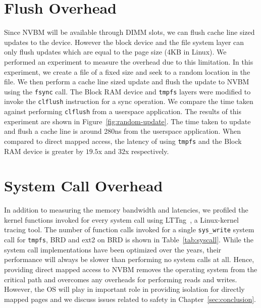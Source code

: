 \section{Flush Overhead}
Since NVBM will be available through DIMM slots, we can flush cache line
sized updates to the device. However the block device and the
file system layer can only flush updates which are equal to the page
size (4KB in Linux). We performed an experiment to measure the
overhead due to this limitation. In this experiment, we create a file
of a fixed size and seek to a random location in the file. We then
perform a cache line sized update and flush the update to NVBM using the
\texttt{fsync} call. The Block RAM device and \texttt{tmpfs} layers were
modified to invoke the \texttt{clflush} instruction for a sync
operation. We compare the time taken against performing
\texttt{clflush} from a userspace application. The results of this
experiment are shown in Figure~\ref{fig:random-update}. The time taken
to update and flush a cache line is around 280ns from the userspace
application. When compared to direct mapped access, the latency
of using \texttt{tmpfs} and the Block RAM device is greater by $19.5$x
and $32$x respectively. 

\section{System Call Overhead}
In addition to measuring the memory bandwidth and latencies, we profiled the
kernel functions invoked for every system call using LTTng~\cite{lttng}, a
Linux-kernel tracing tool. The number of function calls invoked for a single
\texttt{sys\_write} system call for \texttt{tmpfs}, BRD and ext2 on BRD is
shown in Table~\ref{tab:syscall}. While the system call implementations have
been optimized over the years, their performance will always be slower than
performing no system calls at all.  Hence, providing direct mapped access to
NVBM removes the operating system from the critical path and overcomes any
overheads for performing reads and writes.  However, the OS will play in
important role in providing isolation for directly mapped pages and
we discuss issues related to safety in Chapter~\ref{sec:conclusion}.
